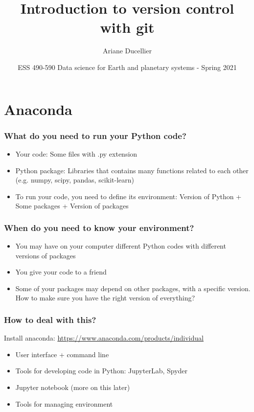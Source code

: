 \documentclass{beamer}
\title[ESS 490-590 - Git tutorial]{Introduction to version control with git}
\author{Ariane Ducellier}
\institute{University of Washington}
\date{ESS 490-590 Data science for Earth and planetary systems - Spring 2021}
\begin{document}
	\begin{frame}
		\titlepage
	\end{frame}

	\section*{Anaconda}

	\begin{frame}
	\frametitle{What do you need to run your Python code?}
	\begin{itemize}
	\setlength\itemsep{1em}
		\item Your code: Some files with .py extension
		\item Python package: Libraries that contains many functions related to each other (e.g. numpy, scipy, pandas, scikit-learn)
		\item To run your code, you need to define its environment: Version of Python + Some packages + Version of packages
	\end{itemize}
	\end{frame}

	\begin{frame}
	\frametitle{When do you need to know your environment?}
	\begin{itemize}
	\setlength\itemsep{1em}
		\item You may have on your computer different Python codes with different versions of packages
		\item You give your code to a friend
		\item Some of your packages may depend on other packages, with a specific version. How to make sure you have the right version of everything?
	\end{itemize}
	\end{frame}

	\begin{frame}
	\frametitle{How to deal with this?}
	Install anaconda: \href{https://www.anaconda.com/products/individual}{https://www.anaconda.com/products/individual}

	\begin{itemize}
	\setlength\itemsep{1em}
		\item User interface + command line
		\item Tools for developing code in Python: JupyterLab, Spyder
		\item  Jupyter notebook (more on this later)
		\item Tools for managing environment
	\end{itemize}
	\end{frame}
\end{document}
